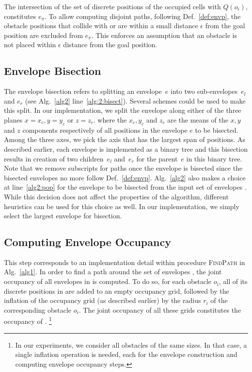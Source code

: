 \documentclass[a4paper]{report}
\begin{document}
%
The intersection of the set of discrete positions of the occupied cells with $Q(o_i)$, constitutes $e_{\pi}$.
%
To allow computing disjoint paths, following Def.~\ref{def:envp}, the obstacle positions that collide with \Sstart or are within a small distance $\epsilon$ from the goal position are excluded from $e_\pi$. This enforces an assumption that an obstacle is not placed within $\epsilon$ distance from the goal position.

\subsection{Envelope Bisection}
The envelope bisection refers to splitting an envelope~$e$ into two sub-envelopes~$e_l$ and $e_r$ (see Alg.~\ref{alg2} line~\ref{alg:2:bisect}). Several schemes could be used to make this split. In our implementation, we split the envelope along either of the three planes $x=x_c, y=y_c$ or $z=z_c$. where the $x_c,y_c$ and $z_c$ are the means of the $x,y$ and $z$ components respectively of all positions in the envelope $e$ to be bisected. Among the three axes, we pick the axis that has the largest span of positions. As described earlier, each envelope is implemented as a binary tree and this bisection results in creation of two children~$e_l$ and~$e_r$ for the parent~$e$ in this binary tree. Note that we remove subscripts for paths once the envelope is bisected since the bisected envelopes no more follow Def.~\ref{def:envp}.
%
Alg.~\ref{alg2} also makes a choice at line~\ref{alg2:pop} for the envelope to be bisected from the input set of envelopes \calE. While this decision does not affect the properties of the algorithm, different heuristics can be used for this choice as well. In our implementation, we simply select the largest envelope for bisection.

\subsection{Computing Envelope Occupancy}
This step corresponds to an implementation detail within procedure \textsc{FindPath} in Alg.~\ref{alg1}. In order to find a path around the set of envelopes \calE, the joint occupancy of all envelopes in \calE is computed. To do so, for each obstacle $o_i$, all of its discrete positions in \calE are added to an empty occupancy grid, followed by the inflation of the occupancy grid (as described earlier) by the radius $r_i$ of the corresponding obstacle $o_i$. The joint occupancy of all these grids constitutes the occupancy of \calE.
%
%
\footnote{In our experiments, we consider all obstacles of the same sizes. In that case, a single inflation operation is needed, each for the envelope construction and computing envelope occupancy steps.}
\end{document}

